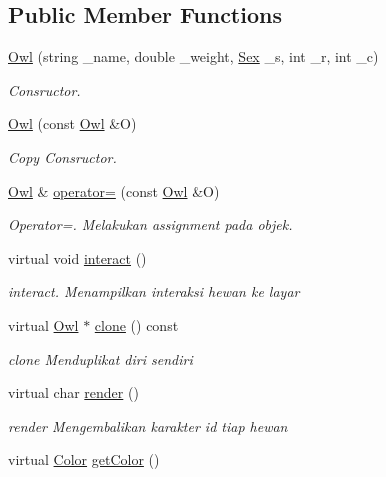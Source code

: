 \subsection*{Public Member Functions}
\begin{DoxyCompactItemize}
\item 
\hyperlink{classOwl_a4bb6bd3794000f439fbbfae52aad4da6}{Owl} (string \+\_\+name, double \+\_\+weight, \hyperlink{sex_8h_a2633cb393c68bb2ee8080db58fb7ba93}{Sex} \+\_\+s, int \+\_\+r, int \+\_\+c)
\begin{DoxyCompactList}\small\item\em Consructor. \end{DoxyCompactList}\item 
\hyperlink{classOwl_aa84b8620ad90ec3fd6490263129b9637}{Owl} (const \hyperlink{classOwl}{Owl} \&O)
\begin{DoxyCompactList}\small\item\em Copy Consructor. \end{DoxyCompactList}\item 
\hyperlink{classOwl}{Owl} \& \hyperlink{classOwl_a21cf9c6fec0e88ca7a14f5bcabfe0323}{operator=} (const \hyperlink{classOwl}{Owl} \&O)
\begin{DoxyCompactList}\small\item\em Operator=. Melakukan assignment pada objek. \end{DoxyCompactList}\item 
virtual void \hyperlink{classOwl_a1ffe69fc425d9f13cb045b8c49d62760}{interact} ()
\begin{DoxyCompactList}\small\item\em interact. Menampilkan interaksi hewan ke layar \end{DoxyCompactList}\item 
virtual \hyperlink{classOwl}{Owl} $\ast$ \hyperlink{classOwl_a2bb2b61736ff978ec96223cc67ba2dfa}{clone} () const 
\begin{DoxyCompactList}\small\item\em clone Menduplikat diri sendiri \end{DoxyCompactList}\item 
virtual char \hyperlink{classOwl_a9ff543ef6e2ee3d70cbb6189e743620a}{render} ()
\begin{DoxyCompactList}\small\item\em render Mengembalikan karakter id tiap hewan \end{DoxyCompactList}\item 
virtual \hyperlink{color_8h_ab87bacfdad76e61b9412d7124be44c1c}{Color} \hyperlink{classOwl_a5c11e4766ff63168dbbe81688f7c360b}{get\+Color} ()

\end{DoxyCompactItemize}
